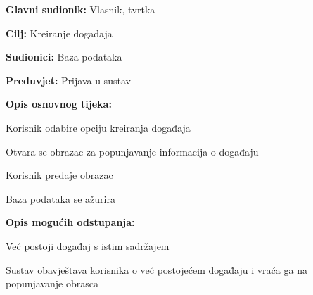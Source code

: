 				\noindent {}
				\begin{packed_item}
					
					\item \textbf{Glavni sudionik: } Vlasnik, tvrtka
					\item  \textbf{Cilj:} Kreiranje događaja
					\item  \textbf{Sudionici:} Baza podataka
					\item  \textbf{Preduvjet:} Prijava u sustav
					\item  \textbf{Opis osnovnog tijeka:}
					
					\item[] \begin{packed_enum}
						
						\item Korisnik odabire opciju kreiranja događaja
						\item Otvara se obrazac za popunjavanje informacija o događaju
						\item Korisnik predaje obrazac
						\item Baza podataka se ažurira
					\end{packed_enum}
					
					\item  \textbf{Opis mogućih odstupanja:}
					
					\item[] \begin{packed_item}
						
						\item[3.a] Već postoji događaj s istim sadržajem
						\item[] \begin{packed_enum}
							
							\item Sustav obavještava korisnika o već postojećem događaju i vraća ga na popunjavanje obrasca
							
						\end{packed_enum}
					\end{packed_item}
				\end{packed_item}
			
